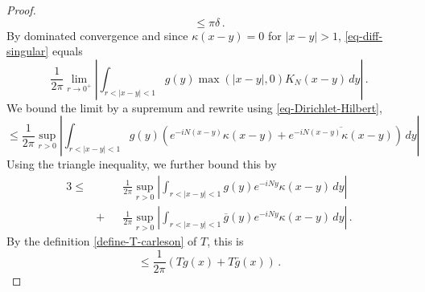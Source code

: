 \documentclass[10pt,a4paper]{article}
\theoremstyle{plain}
\theoremstyle{definition}
\numberwithin{equation}{subsection}
\begin{document}
\begin{proof}
\begin{equation*}
        \le \pi\delta \,.
    \end{equation*}
    By dominated convergence and since $\kappa(x-y) = 0$ for $|x-y| > 1$, \eqref{eq-diff-singular} equals
    \begin{equation*}
        \frac{1}{2\pi} \lim_{r \to 0^+} \left| \int_{r < |x-y| < 1} g(y) \max(|x-y|,0) K_N(x-y) \, dy\right|\,.
    \end{equation*}
    We bound the limit by a supremum and rewrite using \eqref{eq-Dirichlet-Hilbert},
    \begin{equation*}
        \le \frac{1}{2\pi} \sup_{r > 0} \left| \int_{r < |x-y| < 1} g(y) \left(e^{-iN(x-y)}\kappa(x-y) + \overline{e^{-iN(x-y)}\kappa(x-y)}\right) \, dy\right|
    \end{equation*}
    Using the triangle inequality, we further bound this by
    \begin{alignat*}{3}
        \le&&&\frac{1}{2\pi} \sup_{r > 0} \left| \int_{r < |x-y| < 1} g(y) e^{-iNy} \kappa(x-y) \, dy\right| \\
        &+ &&\frac{1}{2\pi} \sup_{r > 0} \left| \int_{r < |x-y| < 1} \overline{g}(y) e^{-iNy} \kappa(x-y) \, dy\right|\,.
    \end{alignat*}
    By the definition \eqref{define-T-carleson} of $T$, this is
    \begin{equation*}
        \le \frac{1}{2\pi} (Tg(x) + T\bar{g}(x))\,.
    \end{equation*}
\end{proof}
\end{document}

